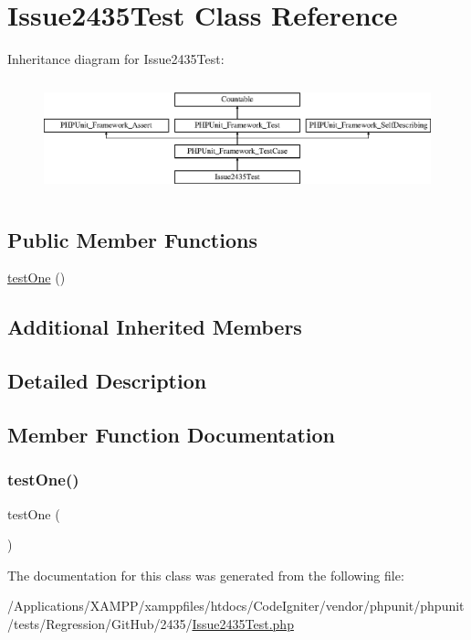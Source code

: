 \hypertarget{class_issue2435_test}{}\section{Issue2435\+Test Class Reference}
\label{class_issue2435_test}
Inheritance diagram for Issue2435\+Test\+:\begin{figure}[H]
\begin{center}
\leavevmode
\includegraphics[height=3.303835cm]{class_issue2435_test}
\end{center}
\end{figure}
\subsection*{Public Member Functions}
\begin{DoxyCompactItemize}
\item 
\mbox{\hyperlink{class_issue2435_test_afbf3ff88b322c6a7197ce02297cd23a0}{test\+One}} ()
\end{DoxyCompactItemize}
\subsection*{Additional Inherited Members}


\subsection{Detailed Description}


\subsection{Member Function Documentation}
\mbox{\label{class_issue2435_test_afbf3ff88b322c6a7197ce02297cd23a0}} 
\subsubsection{\texorpdfstring{test\+One()}{testOne()}}
{\footnotesize\ttfamily test\+One (\begin{DoxyParamCaption}{ }\end{DoxyParamCaption})}



The documentation for this class was generated from the following file\+:\begin{DoxyCompactItemize}
\item 
/\+Applications/\+X\+A\+M\+P\+P/xamppfiles/htdocs/\+Code\+Igniter/vendor/phpunit/phpunit/tests/\+Regression/\+Git\+Hub/2435/\mbox{\hyperlink{_issue2435_test_8php}{Issue2435\+Test.\+php}}\end{DoxyCompactItemize}

